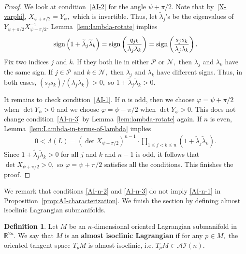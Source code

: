 \documentclass[11pt]{amsart}
\numberwithin{equation}{section}
\theoremstyle{definition}
\theoremstyle{definition}
\newtheorem{definition}[equation]{Definition}
\newcommand{\pr}[1]{\left(#1\right)}
\newcommand{\bb}[1]{\mathbb{#1}} \newcommand{\td}[1]{\widetilde{#1}}
\begin{document}
\begin{proof}
	We look at condition~\eqref{AI-2} for the angle $\psi+\pi/2.$
	Note that by~\eqref{X-varphi}, 
	$X_{\psi+\pi/2} 
	= Y_\psi,$
	which is invertible.
	Thus, let $\td\lambda_j$'s be the eigenvalues of $Y_{\psi+\pi/2} X_{\psi+\pi/2}^{-1}.$
	Lemma~\ref{lem:lambda-rotate} implies	
	\begin{align*} {\rm sign} \pr{1+\td\lambda_j\td\lambda_k}
	= {\rm sign} \pr{\frac{q_{jk}}{\lambda_j\lambda_k}}
	= {\rm sign} \pr{\frac{s_js_k}{\lambda_j\lambda_k}}.
	\end{align*}
	Fix two indices $j$ and $k.$
	If they both lie in either $\mathcal P$ or $\mathcal N,$ then $\lambda_j$ and $\lambda_k$ have the same sign.
	If $j\in\mathcal P$ and $k\in\mathcal N,$ then $\lambda_j$ and $\lambda_k$ have different signs.
    Thus, in both cases, $(s_js_k)/(\lambda_j\lambda_k)>0,$ so $1+\td\lambda_j\td\lambda_k
	>0.$

	It remains to check condition~\eqref{AI-1}.
	If $n$ is odd, then we choose $\varphi=\psi+\pi/2$ when $\det Y_\psi>0$ and we choose $\varphi=\psi-\pi/2$ when $\det Y_\psi>0.$
	This does not change condition~\eqref{AI-n-3} by Lemma~\ref{lem:lambda-rotate} again.
	If $n$ is even, Lemma~\ref{lem:Lambda-in-terms-of-lambda} implies
	\begin{align*}
	0<\Lambda(L)
	= \pr{\det X_{\psi+\pi/2}}^{n-1} \cdot \prod_{1\le j<k\le n} 
	\pr{1+\td\lambda_j \td\lambda_k}.
	\end{align*}
	Since $1+\td\lambda_j\td\lambda_k>0$ for all $j$ and $k$ and $n-1$ is odd, it follows that $\det X_{\psi+\pi/2}>0,$ so $\varphi=\psi+\pi/2$ satisfies all the conditions.
	This finishes the proof.
\end{proof}

We remark that conditions \eqref{AI-n-2} and \eqref{AI-n-3} do not imply \eqref{AI-n-1} in Proposition~\ref{prop:AI-characterization}.
We finish the section by defining almost isoclinic Lagrangian submanifolds.

\begin{definition}
	Let $M$ be an $n$-dimensional oriented Lagrangian submanifold in $\bb R^{2n}.$
	We say that $M$ is an {\bf almost isoclinic Lagrangian} if for any $p\in M,$ the oriented tangent space $T_pM$ is almost isoclinic, i.e. $T_pM\in \mathcal{AI}(n)$.
\end{definition}
\end{document}
